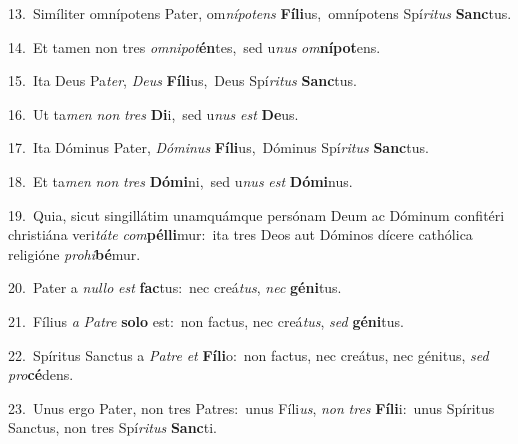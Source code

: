 {\numbfont\textcolor{\numbcolor}{13.}}~Simíliter omnípotens Pater, om\-\textit{ní}\-\textit{pot}\textit{ens} \textbf{Fí}\-\textbf{li}us,~\star omnípotens Spí\-\textit{ri}\-\textit{tus} \textbf{Sanc}\-tus.\par
{\numbfont\textcolor{\numbcolor}{14.}}~Et tamen non tres \textit{om}\-\textit{ni}\textit{pot}\textbf{én}tes,~\star sed u\textit{nus} \textit{om}\-\textbf{ní}\textbf{pot}ens.\par
{\numbfont\textcolor{\numbcolor}{15.}}~Ita Deus Pa\-\textit{ter}\-, \textit{De}\-\textit{us} \textbf{Fí}\-\textbf{li}us,~\star Deus Spí\-\textit{ri}\-\textit{tus} \textbf{Sanc}\-tus.\par
{\numbfont\textcolor{\numbcolor}{16.}}~Ut ta\textit{men} \textit{non} \textit{tres} \textbf{Di}\-i,~\star sed u\textit{nus} \textit{est} \textbf{De}\-us.\par
{\numbfont\textcolor{\numbcolor}{17.}}~Ita Dóminus Pater, \textit{Dó}\-\textit{mi}\textit{nus} \textbf{Fí}\-\textbf{li}us,~\star Dóminus Spí\-\textit{ri}\-\textit{tus} \textbf{Sanc}\-tus.\par
{\numbfont\textcolor{\numbcolor}{18.}}~Et ta\textit{men} \textit{non} \textit{tres} \textbf{Dó}\-\textbf{mi}ni,~\star sed u\textit{nus} \textit{est} \textbf{Dó}\-\textbf{mi}nus.\par
{\numbfont\textcolor{\numbcolor}{19.}}~Quia, sicut singillátim unamquámque persónam Deum ac Dóminum confitéri christiána veri\-\textit{tá}\-\textit{te} \textit{com}\-\textbf{pél}\textbf{li}mur:~\star ita tres Deos aut Dóminos dícere cathólica religióne \textit{pro}\-\textit{hi}\textbf{bé}mur.\par
{\numbfont\textcolor{\numbcolor}{20.}}~Pater a \textit{nul}\-\textit{lo} \textit{est} \textbf{fac}\-tus:~\star nec creá\-\textit{tus}\-, \textit{nec} \textbf{gé}\-\textbf{ni}tus.\par
{\numbfont\textcolor{\numbcolor}{21.}}~Fílius \textit{a} \textit{Pa}\-\textit{tre} \textbf{so}\-\textbf{lo} est:~\star non factus, nec creá\-\textit{tus}\-, \textit{sed} \textbf{gé}\-\textbf{ni}tus.\par
{\numbfont\textcolor{\numbcolor}{22.}}~Spíritus Sanctus a \textit{Pa}\-\textit{tre} \textit{et} \textbf{Fí}\-\textbf{li}o:~\star non factus, nec creátus, nec génitus, \textit{sed} \textit{pro}\-\textbf{cé}dens.\par
{\numbfont\textcolor{\numbcolor}{23.}}~Unus ergo Pater, non tres Patres:~\dagger unus Fíli\-\textit{us}\-, \textit{non} \textit{tres} \textbf{Fí}\-\textbf{li}i:~\star unus Spíritus Sanctus, non tres Spí\-\textit{ri}\-\textit{tus} \textbf{Sanc}\-ti.\par
